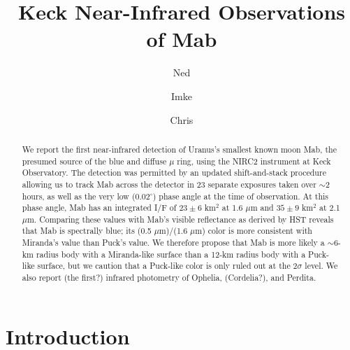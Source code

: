 \documentclass[preprint]{aastex631}
\begin{document}
	
\newcommand{\ergsec}{erg s$^{-1}$ cm$^{-2}$ $\mu$m$^{-1}$}

\title{Keck Near-Infrared Observations of Mab}

\author{Ned}

\author{Imke}

\author{Chris}


\begin{abstract}
We report the first near-infrared detection of Uranus's smallest known moon Mab, the presumed source of the blue and diffuse $\mu$ ring, using the NIRC2 instrument at Keck Observatory. The detection was permitted by an updated shift-and-stack procedure allowing us to track Mab across the detector in 23 separate exposures taken over $\sim$2 hours, as well as the very low (0.02$^\circ$) phase angle at the time of observation.
At this phase angle, Mab has an integrated I/F of $23 \pm 6$ km$^{2}$ at 1.6 $\mu$m and $35 \pm 9$ km$^{2}$ at 2.1 $\mu$m. 
Comparing these values with Mab's visible reflectance as derived by HST reveals that Mab is spectrally blue; its (0.5 $\mu$m)/(1.6 $\mu$m) color is more consistent with Miranda's value than Puck's value. We therefore propose that Mab is more likely a $\sim$6-km radius body with a Miranda-like surface than a 12-km radius body with a Puck-like surface, but we caution that a Puck-like color is only ruled out at the 2$\sigma$ level.
We also report (the first?) infrared photometry of Ophelia, (Cordelia?), and Perdita.
\end{abstract}

\section{Introduction}
\label{s:intro}
\end{document}
